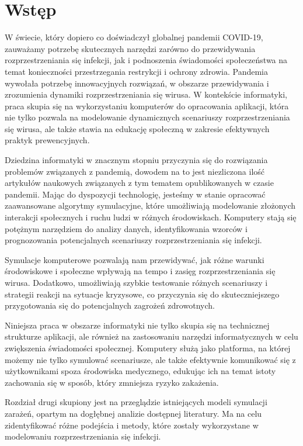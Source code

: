 \chapter{Wstęp}
\label{ch:wstep}

W świecie, który dopiero co doświadczył globalnej pandemii COVID-19, zauważamy potrzebę skutecznych narzędzi zarówno do przewidywania rozprzestrzeniania się infekcji, jak i podnoszenia świadomości społeczeństwa na temat konieczności przestrzegania restrykcji i ochrony zdrowia. Pandemia wywołała potrzebę innowacyjnych rozwiązań, w obszarze przewidywania i zrozumienia dynamiki rozprzestrzeniania się wirusa. W kontekście informatyki, praca skupia się na wykorzystaniu komputerów do opracowania aplikacji, która nie tylko pozwala na modelowanie dynamicznych scenariuszy rozprzestrzeniania się wirusa, ale także stawia na edukację społeczną w zakresie efektywnych praktyk prewencyjnych\cite{bib:simulationforeducation}.

Dziedzina informatyki w znacznym stopniu przyczynia się do rozwiązania problemów związanych z pandemią, dowodem na to jest niezliczona ilość artykułów naukowych związanych z tym tematem opublikowanych w czasie pandemii\cite{bib:covid19}\cite{bib:covid191}\cite{bib:covid192}. Mając do dyspozycji technologię, jesteśmy w stanie opracować zaawansowane algorytmy symulacyjne, które umożliwiają modelowanie złożonych interakcji społecznych i ruchu ludzi w różnych środowiskach. Komputery stają się potężnym narzędziem do analizy danych, identyfikowania wzorców i prognozowania potencjalnych scenariuszy rozprzestrzeniania się infekcji.

Symulacje komputerowe pozwalają nam przewidywać, jak różne warunki środowiskowe i społeczne wpływają na tempo i zasięg rozprzestrzeniania się wirusa. Dodatkowo, umożliwiają szybkie testowanie różnych scenariuszy i strategii reakcji na sytuacje kryzysowe, co przyczynia się do skuteczniejszego przygotowania się do potencjalnych zagrożeń zdrowotnych\cite{bib:Brockmann2017Global}.

Niniejsza praca w obszarze informatyki nie tylko skupia się na technicznej strukturze aplikacji, ale również na zastosowaniu narzędzi informatycznych w celu zwiększenia świadomości społecznej. Komputery służą jako platforma, na której możemy nie tylko symulować scenariusze, ale także efektywnie komunikować się z użytkownikami spoza środowiska medycznego, edukując ich na temat istoty zachowania się w sposób, który zmniejsza ryzyko zakażenia.

Rozdział drugi skupiony jest na przeglądzie istniejących modeli symulacji zarażeń, opartym na dogłębnej analizie dostępnej literatury.
Ma na celu zidentyfikować różne podejścia i metody, które zostały wykorzystane w modelowaniu rozprzestrzeniania się infekcji. 


